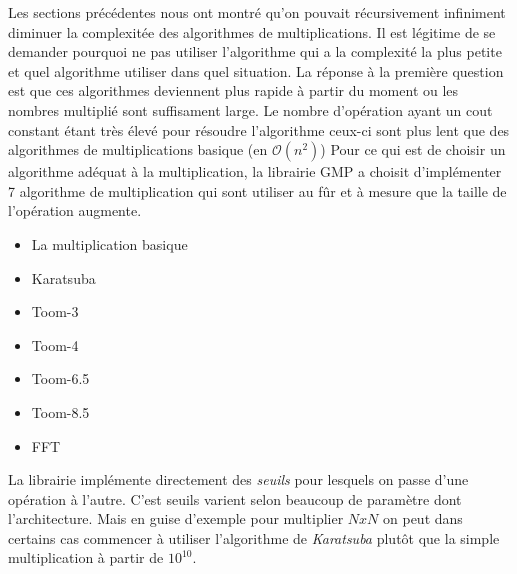\documentclass[letterpaper]{article}
\begin{document}
Les sections précédentes nous ont montré qu'on pouvait récursivement
infiniment diminuer la complexitée des algorithmes de multiplications.
Il est légitime de se demander pourquoi ne pas utiliser l'algorithme
qui a la complexité la plus petite et quel algorithme utiliser dans
quel situation.
\newline
La réponse à la première question est que ces algorithmes deviennent
plus rapide à partir du moment ou les nombres multiplié sont
suffisament large. Le nombre d'opération ayant un cout constant
étant très élevé pour résoudre l'algorithme ceux-ci sont plus lent
que des algorithmes de multiplications basique (en $\mathcal{O}(n^2)$)
\newline
Pour ce qui est de choisir un algorithme adéquat à la multiplication,
la librairie GMP a choisit d'implémenter 7 algorithme de multiplication
qui sont utiliser au fûr et à mesure que la taille de l'opération
augmente\cite{gmplibmultiplication}.

\begin{itemize}
  \item La multiplication basique
  \item Karatsuba
  \item Toom-3
  \item Toom-4
  \item Toom-6.5
  \item Toom-8.5
  \item FFT
\end{itemize}

La librairie implémente directement des \emph{seuils} pour lesquels
on passe d'une opération à l'autre. C'est seuils varient selon
beaucoup de paramètre dont l'architecture. Mais en guise d'exemple
pour multiplier $NxN$ on peut dans certains cas commencer à utiliser
l'algorithme de \emph{Karatsuba} plutôt que la simple multiplication
à partir de $10^{10}$\cite{gmplibkaratsuba}.
\end{document}
